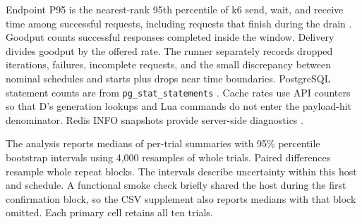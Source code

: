 Endpoint P95 is the nearest-rank 95th percentile of k6 send, wait, and receive time among successful requests, including requests that finish during the drain \cite{k6metrics}. Goodput counts successful responses completed inside the window. Delivery divides goodput by the offered rate. The runner separately records dropped iterations, failures, incomplete requests, and the small discrepancy between nominal schedules and starts plus drops near time boundaries. PostgreSQL statement counts are from \texttt{pg\_stat\_statements} \cite{pgstats}. Cache rates use API counters so that D's generation lookups and Lua commands do not enter the payload-hit denominator. Redis INFO snapshots provide server-side diagnostics \cite{redisinfo}.

The analysis reports medians of per-trial summaries with 95\% percentile bootstrap intervals using 4{,}000 resamples of whole trials. Paired differences resample whole repeat blocks. The intervals describe uncertainty within this host and schedule. A functional smoke check briefly shared the host during the first confirmation block, so the CSV supplement also reports medians with that block omitted. Each primary cell retains all ten trials.
